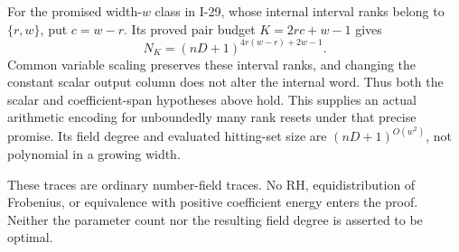 For the promised width-$w$ class in I-29, whose internal interval
ranks belong to $\{r,w\}$, put $c=w-r$. Its proved pair budget
$K=2rc+w-1$ gives
\[
 N_K=(nD+1)^{4r(w-r)+2w-1}.
\]
Common variable scaling preserves these interval ranks, and
changing the constant scalar output column does not alter the
internal word. Thus both the scalar and coefficient-span
hypotheses above hold. This supplies an actual arithmetic
encoding for unboundedly many rank resets under that precise
promise. Its field degree and evaluated hitting-set size are
$(nD+1)^{O(w^2)}$, not polynomial in a growing width.

These traces are ordinary number-field traces. No RH,
equidistribution of Frobenius, or equivalence with positive coefficient
energy enters the proof. Neither the parameter count nor
the resulting field degree is asserted to be optimal.

